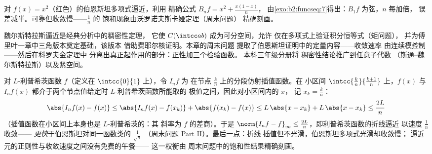 \begin{omfigure}

{\small 对 $f(x) = x^2$（红色）的伯恩斯坦多项式逼近，利用
精确公式 $B_nf = x^2 + \frac{x(1-x)}{n}$，
由\cref{exo:b2:funcseq:7}得出：$B_1f$ 为弦，$n$ 每加倍，
误差减半。可靠但收敛慢——$\frac1n$ 的
饱和现象由沃罗诺夫斯卡娅定理（周末问题）
精确刻画。}
\end{omfigure}

\begin{remark}[应用]
魏尔斯特拉斯逼近是经典分析中的稠密性定理，
它使 $C(\intcc ab)$ 成为可分空间，允许
仅在多项式上验证积分恒等式（矩问题），
并为傅里叶一章中三角版本奠定基础，该版本
借助费耶尔核证明。本章的周末问题
提取了伯恩斯坦证明中的定量内容——收敛速率
由连续模控制——然后在科罗夫金定理中
分离出真正起作用的部分：正性加三个检验函数。
本科三年级分册将
稠密性结论推广到任意子代数
（斯通–魏尔斯特拉斯）以及紧空间。
\end{remark}

\begin{example}[带收敛速率的折线逼近]\label{ex:b2:funcseq:polygonal}
对 $L$-利普希茨函数 $f$（定义在 $\intcc{0}{1}$ 上），令 $I_nf$ 为
在节点 $\frac kn$ 上的分段仿射插值函数。在
小区间 $\intcc{\frac kn}{\frac{k+1}n}$ 上，$f(x)$ 与
$I_nf(x)$ 都介于两个节点值给定时 $L$-利普希茨函数所能取的
极值之间，因此对小区间内的 $x$，
记 $x_k = \frac kn$：
\[
\abs{I_nf(x) - f(x)}
\leq \abs{I_nf(x) - f(x_k)} + \abs{f(x_k) - f(x)}
\leq L\,\abs{x - x_k} + L\,\abs{x - x_k}
\leq \frac{2L}{n}
\]
（插值函数在小区间上本身也是 $L$-利普希茨的：其
斜率为 $f$ 的差商）。于是 $\norm{I_nf -
f}_\infty \leq \frac{2L}{n}$，即利普希茨函数的折线逼近
以速度 $\frac1n$ 收敛——
\emph{更快}于伯恩斯坦对同一函数类的 $\frac{1}{\sqrt n}$
（周末问题 Part II）。最后一点：折线
插值但不光滑，伯恩斯坦多项式光滑却收敛慢；
逼近元的正则性与收敛速度之间没有免费的午餐——
这一权衡由
周末问题中的饱和性结果精确刻画。
\end{example}

